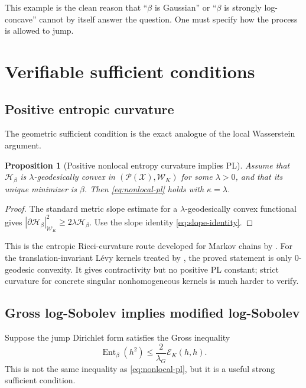\documentclass[11pt]{article}
\newtheorem{proposition}[theorem]{Proposition}
\theoremstyle{definition}
\DeclareMathOperator{\Ent}{Ent}
\newcommand{\Pp}{\mathcal P}
\newcommand{\cE}{\mathcal E}
\newcommand{\cH}{\mathcal H}
\newcommand{\cW}{\mathcal W}
\newcommand{\abs}[1]{\left\lvert #1\right\rvert}
\begin{document}
This example is the clean reason that ``$\beta$ is Gaussian'' or
``$\beta$ is strongly log-concave'' cannot by itself answer the question.
One must specify how the process is allowed to jump.

\section{Verifiable sufficient conditions}

\subsection{Positive entropic curvature}

The geometric sufficient condition is the exact analogue of the local
Wasserstein argument.

\begin{proposition}[Positive nonlocal entropy curvature implies PL]
\label{prop:curvature-implies-nonlocal-pl}
Assume that $\cH_\beta$ is $\lambda$-geodesically convex in
$(\Pp(\mathcal X),\cW_K)$ for some $\lambda>0$, and that its unique minimizer
is $\beta$.  Then \eqref{eq:nonlocal-pl} holds with
$\kappa=\lambda$.
\end{proposition}

\begin{proof}
The standard metric slope estimate for a $\lambda$-geodesically convex
functional gives
$\abs{\partial\cH_\beta}_{\cW_K}^2
\geq2\lambda\cH_\beta$.  Use the slope identity
\eqref{eq:slope-identity}.
\end{proof}

This is the entropic Ricci-curvature route developed for Markov chains by
\citet{ErbarMaas2012}.  For the translation-invariant L\'evy kernels treated
by \citet{Erbar2014JumpEntropy}, the proved statement is only
$0$-geodesic convexity.  It gives contractivity but no positive PL constant;
strict curvature for concrete singular nonhomogeneous kernels is much harder
to verify.

\subsection{Gross log-Sobolev implies modified log-Sobolev}

Suppose the jump Dirichlet form satisfies the Gross inequality
\begin{equation}\label{eq:gross-jump-lsi}
  \Ent_\beta(h^2)
  \leq \frac{2}{\lambda_G}\cE_K(h,h).
\end{equation}
This is not the same inequality as \eqref{eq:nonlocal-pl}, but it is a useful
strong sufficient condition.
\end{document}

